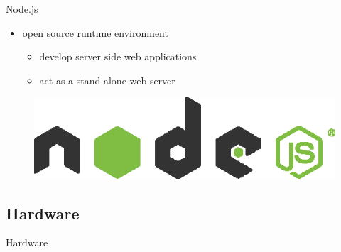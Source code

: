 \begin{frame}{Node.js}

  \begin{itemize}
    \item open source runtime environment
    \begin{itemize}
        \item develop server side web applications
        \item act as a stand alone web server
    \end{itemize}

  \end{itemize}

  \begin{figure}[htb]
    \centering
    \includegraphics[width=0.97\linewidth, keepaspectratio]{./resources/nodejs-light.eps}
    \nocite{nodejs:logo}
  \end{figure}

\end{frame}

\subsection{Hardware}
\begin{frame}{Hardware}

\end{frame}
